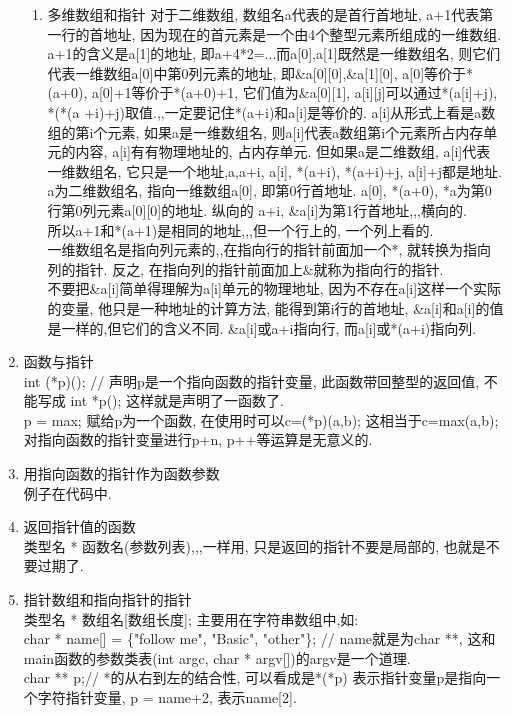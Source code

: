 \documentclass[a4paper,10pt,english]{article}
\begin{document}
\begin{enumerate}
\begin{enumerate}
\item {多维数组和指针}
对于二维数组, 数组名a代表的是首行首地址, a+1代表第一行的首地址, 因为现在的首元素是一个由4个整型元素所组成的一维数组. a+1的含义是a[1]的地址, 即a+4*2=...而a[0],a[1]既然是一维数组名, 则它们代表一维数组a[0]中第0列元素的地址, 即\&a[0][0],\&a[1][0], a[0]等价于*(a+0), a[0]+1等价于*(a+0)+1, 它们值为\&a[0][1], a[i][j]可以通过*(a[i]+j), *(*(a
+i)+j)取值.,,一定要记住*(a+i)和a[i]是等价的. a[i]从形式上看是a数组的第i个元素, 如果a是一维数组名, 则a[i]代表a数组第i个元素所占内存单元的内容, a[i]有有物理地址的, 占内存单元. 但如果a是二维数组, a[i]代表一维数组名, 它只是一个地址,a,a+i, a[i], *(a+i), *(a+i)+j, a[i]+j都是地址.\\
a为二维数组名, 指向一维数组a[0], 即第0行首地址. 
a[0], *(a+0), *a为第0行第0列元素a[0][0]的地址. 纵向的
a+i, \&a[i]为第1行首地址,,,横向的. \\
所以a+1和*(a+1)是相同的地址,,,但一个行上的, 一个列上看的. \\
一维数组名是指向列元素的,,在指向行的指针前面加一个*, 就转换为指向列的指针. 反之, 在指向列的指针前面加上$\&$就称为指向行的指针.\\
不要把\&a[i]简单得理解为a[i]单元的物理地址, 因为不存在a[i]这样一个实际的变量, 他只是一种地址的计算方法, 能得到第i行的首地址, \&a[i]和a[i]的值是一样的,但它们的含义不同. \&a[i]或a+i指向行, 而a[i]或*(a+i)指向列. 
\end{enumerate}

\item{函数与指针}\\
int (*p)(); // 声明p是一个指向函数的指针变量, 此函数带回整型的返回值, 不能写成 int *p(); 这样就是声明了一函数了. \\
p = max; 赋给p为一个函数, 在使用时可以c=(*p)(a,b); 这相当于c=max(a,b); \\
对指向函数的指针变量进行p+n, p++等运算是无意义的.
\item{用指向函数的指针作为函数参数}\\
例子在代码中.
\item{返回指针值的函数}\\
类型名 * 函数名(参数列表),,,一样用, 只是返回的指针不要是局部的, 也就是不要过期了.
\item{指针数组和指向指针的指针}\\
类型名 * 数组名[数组长度]; 主要用在字符串数组中,如: \\
char * name[] = \{"follow me", "Basic", "other"\}; // name就是为char **, 这和main函数的参数类表(int argc, char * argv[])的argv是一个道理. \\
char ** p;// *的从右到左的结合性, 可以看成是*(*p) 表示指针变量p是指向一个字符指针变量, p = name+2, 表示name[2]. 
\end{enumerate}
\end{document}
